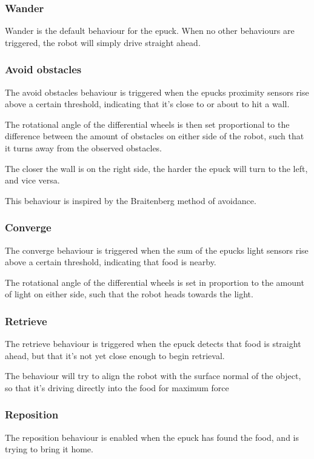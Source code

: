 \documentclass{article}
\begin{document}
\subsubsection{Wander}
Wander is the default behaviour for the epuck. When no other behaviours are triggered, the robot will simply drive straight ahead.

\subsubsection{Avoid obstacles}
The avoid obstacles behaviour is triggered when the epucks proximity sensors rise above a certain threshold, indicating that it's close to or about to hit a wall.

The rotational angle of the differential wheels is then set proportional to the difference between the amount of obstacles on either side of the robot, such that it turns away from the observed obstacles. 

The closer the wall is on the right side, the harder the epuck will turn to the left, and vice versa. 

This behaviour is inspired by the Braitenberg method of avoidance.
 
\subsubsection{Converge}
The converge behaviour is triggered when the sum of the epucks light sensors rise above a certain threshold, indicating that food is nearby.

The rotational angle of the differential wheels is set in proportion to the amount of light on either side, such that the robot heads towards the light.

\subsubsection{Retrieve}
The retrieve behaviour is triggered when the epuck detects that food is straight ahead, but that it's not yet close enough to begin retrieval.

The behaviour will try to align the robot with the surface normal of the object, so that it's driving directly into the food for maximum force

\subsubsection{Reposition}
The reposition behaviour is enabled when the epuck has found the food, and is trying to bring it home. 
\end{document}

